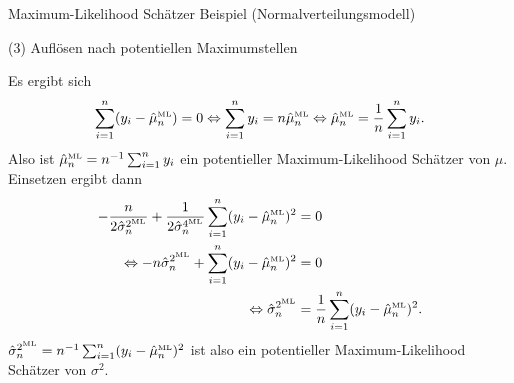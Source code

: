 \documentclass[
  8pt,
  ignorenonframetext,
]{beamer}
\begin{document}
\begin{frame}{Maximum-Likelihood Schätzer}
\protect\hypertarget{maximum-likelihood-schuxe4tzer-9}{}
Beispiel (Normalverteilungsmodell)

\small

\noindent (3) Auflösen nach potentiellen Maximumstellen

\footnotesize

Es ergibt sich \begin{equation}
\sum_{i=1}^n (y_i-\hat{\mu}_{n}^{\mbox{\tiny ML}})  = 0
\Leftrightarrow \sum_{i=1}^n y_i  = n\hat{\mu}_{n}^{\mbox{\tiny ML}}
\Leftrightarrow \hat{\mu}_{n}^{\mbox{\tiny ML}} = \frac{1}{n}\sum_{i=1}^n y_i.
\end{equation} Also ist
\(\hat{\mu}_{n}^{\mbox{\tiny ML}} = n^{-1}\sum_{i=1}^n y_i\) ein
potentieller Maximum-Likelihood Schätzer von \(\mu\). Einsetzen ergibt
dann\\
\begin{align}
\begin{split}
- \frac{n}{2 \hat{\sigma}^{2^{\mbox{\tiny ML}}}_n} + \frac{1}{2\hat{\sigma}^{4^{\mbox{\tiny ML}}}_n}\sum_{i=1}^n(y_i-\hat{\mu}_{n}^{\mbox{\tiny ML}})^2 & = 0 \\
\Leftrightarrow
- n\hat{\sigma}^{2^{\mbox{\tiny ML}}}_n + \sum_{i=1}^n(y_i-\hat{\mu}_{n}^{\mbox{\tiny ML}})^2 & = 0 \\
\Leftrightarrow
\hat{\sigma}^{2^{\mbox{\tiny ML}}}_n & = \frac{1}{n} \sum_{i=1}^n(y_i-\hat{\mu}_{n}^{\mbox{\tiny ML}})^2.
\end{split}
\end{align}
\(\hat{\sigma}^{2^{\mbox{\tiny ML}}}_n = n^{-1}\sum_{i=1}^n(y_i-\hat{\mu}_{n}^{\mbox{\tiny ML}})^2\)
ist also ein potentieller Maximum-Likelihood Schätzer von \(\sigma^2\).
\end{frame}
\end{document}
